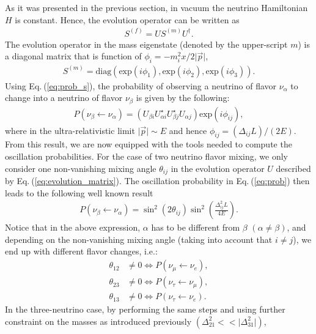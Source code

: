 \documentclass[twocolumn,secnumarabic,amssymb, nobibnotes, aps, prd,10pt]{revtex4-1}
\newcommand{\Eq}[1]{Eq.$\:$(\ref{#1})}
\begin{document}
As it was presented in the previous section, in vacuum the neutrino Hamiltonian $H$ is
constant. Hence, the evolution operator can be written as
\begin{align}
S^{(f)} = U S^{(m)} U^\dagger .
\end{align}
The evolution operator in the mass eigenstate (denoted by the upper-script $m$) is a 
diagonal matrix that is function of $\phi_i = -m_i^2 x / 2 \vert \vec{p} \vert$,
\begin{align}
S^{(m)} = \mathrm{diag} \left( \mathrm{exp}(i \phi_1), \mathrm{exp}(i \phi_2), 
\mathrm{exp}(i \phi_3) \right) .
\end{align}
Using \Eq{eq:prob_s}, the probability of observing a neutrino of flavor 
$\nu_\alpha$ to change into a neutrino of flavor $\nu_\beta$ is given by the following:
\begin{align}
P (\nu_\beta \longleftarrow \nu_\alpha) = \left( U_{\beta i} U^\star_{\alpha i} 
U^\star_{\beta j} U_{\alpha j} \right) \mathrm{exp}(i \phi_{ij}),
\label{eq:prob}
\end{align}
where in the ultra-relativistic limit $\vert \vec{p} \vert \sim E$ and hence
$\phi_{ij} = \left( \Delta_{ij} L \right) / (2 E)$.
From this result, we are now equipped with the tools needed to compute the oscillation
probabilities. For the case of two neutrino flavor mixing, we only consider one 
non-vanishing mixing angle $\theta_{ij}$ in the evolution operator $U$ described
by \Eq{eq:evolution_matrix}. The oscillation probability in \Eq{eq:prob} then leads
to the following well known result
\begin{align}
P (\nu_\beta \longleftarrow \nu_\alpha) = \sin^2 (2 \theta_{ij}) \sin^2 \left(
\frac{\Delta_{ij}^2 L}{4 E} \right) .
\label{eq:2OscProb}
\end{align}
Notice that in the above expression, $\alpha$ has to be different from $\beta$ 
$(\alpha \neq \beta)$, and depending on the non-vanishing mixing angle (taking into
account that $i \neq j$), we end up with different flavor changes, i.e.:
\begin{align}
\theta_{12} & \neq 0 \Longleftrightarrow P (\nu_\mu \longleftarrow \nu_e), \\
\theta_{23} & \neq 0 \Longleftrightarrow P (\nu_\tau \longleftarrow \nu_\mu), \\
\theta_{13} & \neq 0 \Longleftrightarrow P (\nu_\tau \longleftarrow \nu_e) .
\end{align}
In the three-neutrino case, by performing the same steps and using further constraint
on the masses as introduced previously $(\Delta_{21}^2 << \vert \Delta_{31}^2 \vert)$,
\end{document}
